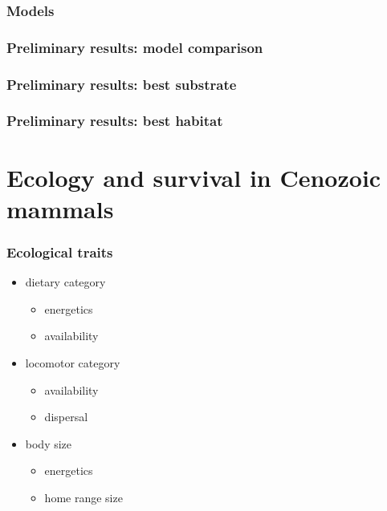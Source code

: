 \documentclass{beamer} \usepackage{amsmath,amsthm}
\begin{document}
\begin{frame}
  \frametitle{Models}
\end{frame}

\begin{frame}
  \frametitle{Preliminary results: model comparison}
\end{frame}

\begin{frame}
  \frametitle{Preliminary results: best substrate}
\end{frame}

\begin{frame}
  \frametitle{Preliminary results: best habitat}
\end{frame}


\section{Ecology and survival in Cenozoic mammals}

\begin{frame}
  \frametitle{Ecological traits}

  \begin{itemize}
    \item dietary category
      \begin{itemize}
        \item energetics
        \item availability
      \end{itemize}
    \item locomotor category
      \begin{itemize}
        \item availability
        \item dispersal
      \end{itemize}
    \item body size
      \begin{itemize}
        \item energetics
        \item home range size
      \end{itemize}
  \end{itemize}
\end{frame}
\end{document}
